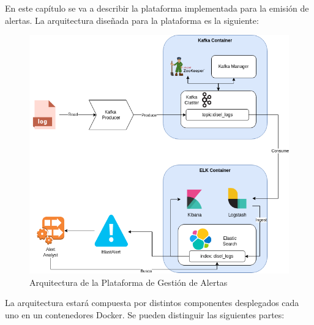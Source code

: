 En este capítulo se va a describir la plataforma implementada para la emisión de alertas. La arquitectura diseñada para la plataforma es la siguiente:

\begin{figure}[H]
\centerline{\includegraphics[width=15cm]{figuras/arquitectura.png}}
\caption{Arquitectura de la Plataforma de Gestión de Alertas}
\label{enlace1}
\end{figure}

La arquitectura estará compuesta por distintos componentes desplegados cada uno en un contenedores Docker. Se pueden distinguir las siguientes partes:

